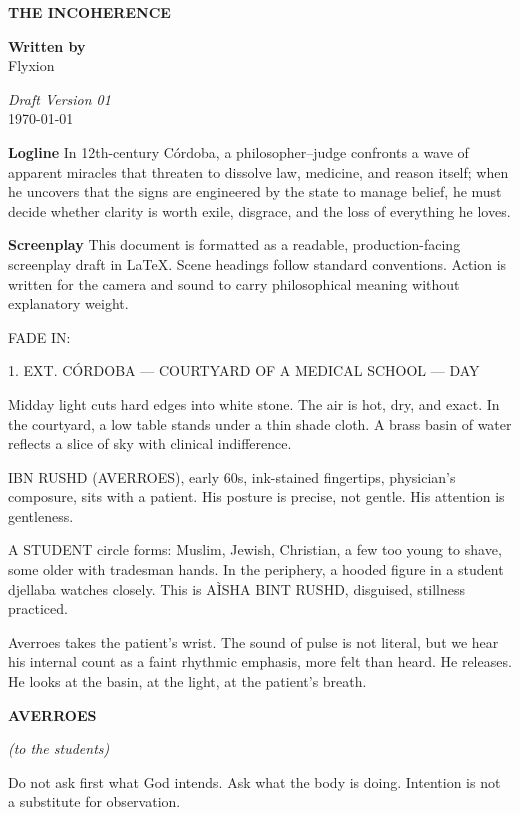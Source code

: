 \documentclass[12pt]{article}
\newlength{\charindent}
\newlength{\dialogueindent}
\newlength{\dialoguewidth}
\newcommand{\filmtitle}[1]{\begin{center}\LARGE\textbf{#1}\end{center}}
\newcommand{\sectionhead}[1]{\vspace{1em}\textbf{#1}\vspace{0.25em}}
\newcommand{\slug}[1]{\vspace{1.25em}\textsc{#1}\vspace{0.5em}}
\newcommand{\action}[1]{#1}
\newcommand{\character}[1]{%
  \par\vspace{0.75em}%
  \hspace*{\charindent}\textbf{#1}%
}
\newcommand{\parenthetical}[1]{%
  \par\nobreak
  \hspace*{\dialogueindent}\textit{(#1)}%
}
\newcommand{\dialogue}[1]{%
  \par\nobreak
  \hspace*{\dialogueindent}%
  \begin{minipage}[t]{\dialoguewidth}
  #1
  \end{minipage}
}
\begin{document}
\filmtitle{THE INCOHERENCE}

\begin{center}
\vspace{1em}
\textbf{Written by}\\
Flyxion

\vspace{0.5em}
\textit{Draft Version 01}\\
\today
\vspace{1.5em}
\end{center}

\sectionhead{Logline}
In 12th-century C\'ordoba, a philosopher--judge confronts a wave of apparent miracles that threaten to dissolve law, medicine, and reason itself; when he uncovers that the signs are engineered by the state to manage belief, he must decide whether clarity is worth exile, disgrace, and the loss of everything he loves.

\sectionhead{Screenplay}
This document is formatted as a readable, production-facing screenplay draft in \LaTeX. Scene headings follow standard conventions. Action is written for the camera and sound to carry philosophical meaning without explanatory weight.

\slug{FADE IN:}

\slug{1. EXT. C\'ORDOBA --- COURTYARD OF A MEDICAL SCHOOL --- DAY}

\action{Midday light cuts hard edges into white stone. The air is hot, dry, and exact. In the courtyard, a low table stands under a thin shade cloth. A brass basin of water reflects a slice of sky with clinical indifference.}

\action{IBN RUSHD (AVERROES), early 60s, ink-stained fingertips, physician's composure, sits with a patient. His posture is precise, not gentle. His attention is gentleness.}

\action{A STUDENT circle forms: Muslim, Jewish, Christian, a few too young to shave, some older with tradesman hands. In the periphery, a hooded figure in a student djellaba watches closely. This is A\`ISHA BINT RUSHD, disguised, stillness practiced.}

\action{Averroes takes the patient's wrist. The sound of pulse is not literal, but we hear his internal count as a faint rhythmic emphasis, more felt than heard. He releases. He looks at the basin, at the light, at the patient's breath.}

\character{AVERROES}
\parenthetical{to the students}
\dialogue{Do not ask first what God intends. Ask what the body is doing. Intention is not a substitute for observation.}
\end{document}
